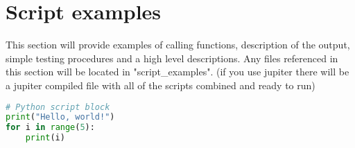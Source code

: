 \documentclass[a4paper,10pt]{article}
\begin{document}
\section[]{Script examples}

This section will provide examples of calling functions, description of the output, simple testing procedures and a high level descriptions. 
Any files referenced in this section will be located in  "script\_examples". (if you use jupiter there will be a jupiter compiled file with all of the scripts combined and ready to run) 

\begin{lstlisting}[language=Python, caption={Example script}]
# Python script block
print("Hello, world!")
for i in range(5):
    print(i)
\end{lstlisting}
\end{document}

